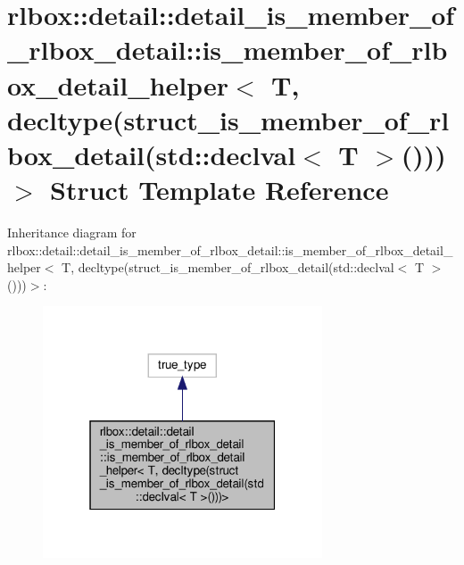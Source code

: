 \hypertarget{structrlbox_1_1detail_1_1detail__is__member__of__rlbox__detail_1_1is__member__of__rlbox__detail_586dbac5071c7fb9e9b52cfd4627c31a}{}\section{rlbox\+:\+:detail\+:\+:detail\+\_\+is\+\_\+member\+\_\+of\+\_\+rlbox\+\_\+detail\+:\+:is\+\_\+member\+\_\+of\+\_\+rlbox\+\_\+detail\+\_\+helper$<$ T, decltype(struct\+\_\+is\+\_\+member\+\_\+of\+\_\+rlbox\+\_\+detail(std\+:\+:declval$<$ T $>$()))$>$ Struct Template Reference}
\label{structrlbox_1_1detail_1_1detail__is__member__of__rlbox__detail_1_1is__member__of__rlbox__detail_586dbac5071c7fb9e9b52cfd4627c31a}


Inheritance diagram for rlbox\+:\+:detail\+:\+:detail\+\_\+is\+\_\+member\+\_\+of\+\_\+rlbox\+\_\+detail\+:\+:is\+\_\+member\+\_\+of\+\_\+rlbox\+\_\+detail\+\_\+helper$<$ T, decltype(struct\+\_\+is\+\_\+member\+\_\+of\+\_\+rlbox\+\_\+detail(std\+:\+:declval$<$ T $>$()))$>$\+:\nopagebreak
\begin{figure}[H]
\begin{center}
\leavevmode
\includegraphics[width=235pt]{structrlbox_1_1detail_1_1detail__is__member__of__rlbox__detail_1_1is__member__of__rlbox__detail_2338b424c73790b40d6edf8f11a55113}
\end{center}
\end{figure}


